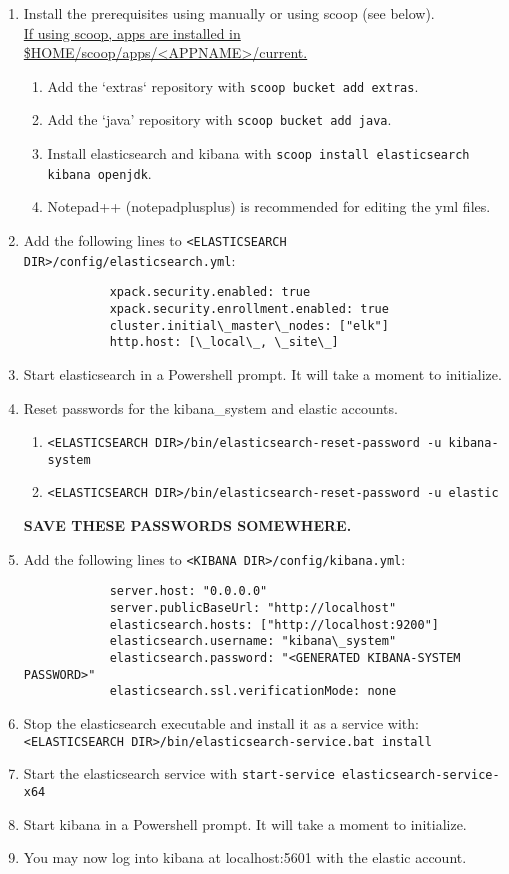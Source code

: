 \documentclass[12pt,letterpaper]{article}
\def\code#1{\textcolor{iris}{\texttt{#1}}}
\def\bf#1{\textbf{#1}}
\def\ul#1{\underline{#1}}
\begin{document}
\begin{enumerate}
	\item Install the prerequisites	using manually or using scoop (see below). \\
	\ul{If using scoop, apps are installed in \$HOME/scoop/apps/<APPNAME>/current.}
		\begin{enumerate}
			\item Add the `extras` repository with \code{scoop bucket add extras}.
			\item Add the `java' repository with \code{scoop bucket add java}.
			\item Install elasticsearch and kibana with \code{scoop install elasticsearch kibana openjdk}.
			\item Notepad++ (notepadplusplus) is recommended for editing the yml files.
		\end{enumerate}
	\item Add the following lines to \code{<ELASTICSEARCH DIR>/config/elasticsearch.yml}:
		{ \color{iris} \begin{verbatim}
			xpack.security.enabled: true
			xpack.security.enrollment.enabled: true
			cluster.initial\_master\_nodes: ["elk"]
			http.host: [\_local\_, \_site\_]
		\end{verbatim} }
	\item Start elasticsearch in a Powershell prompt. It will take a moment to initialize.
	\item Reset passwords for the kibana\_system and elastic accounts.
		\begin{enumerate}
			\item \code{<ELASTICSEARCH DIR>/bin/elasticsearch-reset-password -u kibana-system}
			\item \code{<ELASTICSEARCH DIR>/bin/elasticsearch-reset-password -u elastic}
		\end{enumerate}
	\bf{SAVE THESE PASSWORDS SOMEWHERE.}
	\item Add the following lines to \code{<KIBANA DIR>/config/kibana.yml}:
		{ \color{iris} \begin{verbatim}
			server.host: "0.0.0.0"
			server.publicBaseUrl: "http://localhost"
			elasticsearch.hosts: ["http://localhost:9200"]
			elasticsearch.username: "kibana\_system"
			elasticsearch.password: "<GENERATED KIBANA-SYSTEM PASSWORD>"
			elasticsearch.ssl.verificationMode: none
		\end{verbatim} }
	\item Stop the elasticsearch executable and install it as a service with: \\
		\code{<ELASTICSEARCH DIR>/bin/elasticsearch-service.bat install}
	\item Start the elasticsearch service with \code{start-service elasticsearch-service-x64}
	\item Start kibana in a Powershell prompt. It will take a moment to initialize.
	\item You may now log into kibana at localhost:5601 with the elastic account.
\end{enumerate}
\end{document}
